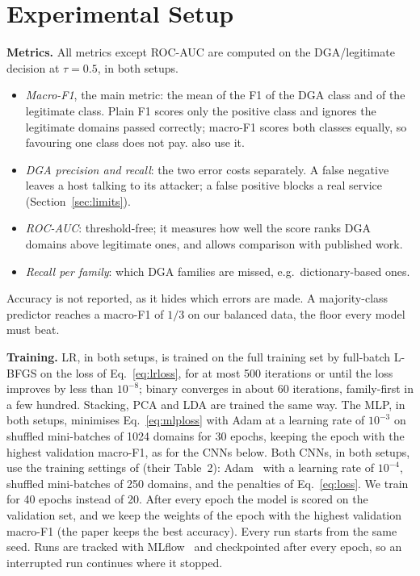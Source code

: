 \documentclass[11pt]{article}
\begin{document}
\section{Experimental Setup}\label{sec:setup}
\textbf{Metrics.} All metrics except ROC-AUC are computed on the DGA/legitimate
decision at $\tau = 0.5$, in both setups.
\begin{itemize}
  \item \emph{Macro-F1}, the main metric: the mean of the F1 of the DGA class and
  of the legitimate class. Plain F1 scores only the positive class and ignores the
  legitimate domains passed correctly; macro-F1 scores both classes equally, so
  favouring one class does not pay. \citet{woodbridge2016lstm} also use it.
  \item \emph{DGA precision and recall}: the two error costs separately. A false
  negative leaves a host talking to its attacker; a false positive blocks a real
  service (Section~\ref{sec:limits}).
  \item \emph{ROC-AUC}: threshold-free; it measures how well the score ranks DGA
  domains above legitimate ones, and allows comparison with published work.
  \item \emph{Recall per family}: which DGA families are missed, e.g.\
  dictionary-based ones.
\end{itemize}
Accuracy is not reported, as it hides which errors are made. A majority-class
predictor reaches a macro-F1 of $1/3$ on our balanced data, the floor every model
must beat.

\textbf{Training.} LR, in both setups, is trained on the full training set by
full-batch L-BFGS on the loss of Eq.~\eqref{eq:lrloss}, for at most 500 iterations or
until the loss improves by less than $10^{-8}$; binary converges in about 60
iterations, family-first in a few hundred. Stacking, PCA and LDA are trained the same way.
The MLP, in both setups, minimises Eq.~\eqref{eq:mlploss} with Adam at a learning rate
of $10^{-3}$ on shuffled mini-batches of 1024 domains for 30 epochs, keeping the epoch
with the highest validation macro-F1, as for the CNNs below.
Both CNNs, in both setups, use the training settings of
\citet{gregorio2024incremental} (their Table~2): Adam~\cite{kingma2015adam} with a
learning rate of $10^{-4}$, shuffled mini-batches of 250 domains, and the penalties
of Eq.~\eqref{eq:loss}. We train for 40 epochs instead of 20. After every epoch the
model is scored on the validation set, and we keep the weights of the epoch with
the highest validation macro-F1 (the paper keeps the best accuracy). Every run
starts from the same seed. Runs are tracked with MLflow~\cite{zaharia2018mlflow}
and checkpointed after every epoch, so an interrupted run continues where it
stopped.
\end{document}
